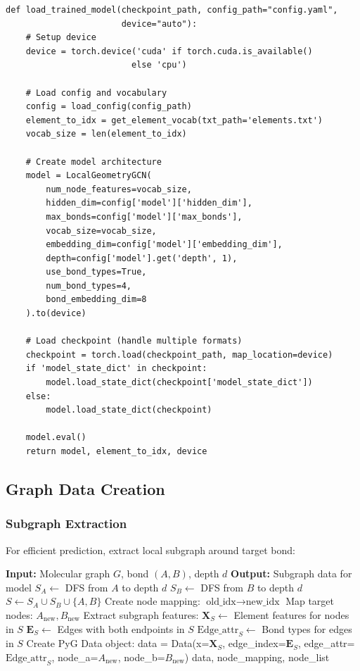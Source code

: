 \documentclass[11pt,a4paper]{article}
\begin{document}
\begin{lstlisting}[caption={Load Trained Model (lines 38-100)}]
def load_trained_model(checkpoint_path, config_path="config.yaml",
                       device="auto"):
    # Setup device
    device = torch.device('cuda' if torch.cuda.is_available()
                         else 'cpu')

    # Load config and vocabulary
    config = load_config(config_path)
    element_to_idx = get_element_vocab(txt_path='elements.txt')
    vocab_size = len(element_to_idx)

    # Create model architecture
    model = LocalGeometryGCN(
        num_node_features=vocab_size,
        hidden_dim=config['model']['hidden_dim'],
        max_bonds=config['model']['max_bonds'],
        vocab_size=vocab_size,
        embedding_dim=config['model']['embedding_dim'],
        depth=config['model'].get('depth', 1),
        use_bond_types=True,
        num_bond_types=4,
        bond_embedding_dim=8
    ).to(device)

    # Load checkpoint (handle multiple formats)
    checkpoint = torch.load(checkpoint_path, map_location=device)
    if 'model_state_dict' in checkpoint:
        model.load_state_dict(checkpoint['model_state_dict'])
    else:
        model.load_state_dict(checkpoint)

    model.eval()
    return model, element_to_idx, device
\end{lstlisting}

\subsection{Graph Data Creation}

\subsubsection{Subgraph Extraction}

For efficient prediction, extract local subgraph around target bond:

\begin{algorithm}
\caption{Extract Bond Subgraph}
\begin{algorithmic}[1]
\State \textbf{Input:} Molecular graph $G$, bond $(A, B)$, depth $d$
\State \textbf{Output:} Subgraph data for model
\State
\State $S_A \gets$ DFS from $A$ to depth $d$
\State $S_B \gets$ DFS from $B$ to depth $d$
\State $S \gets S_A \cup S_B \cup \{A, B\}$
\State
\State Create node mapping: $\text{old\_idx} \rightarrow \text{new\_idx}$
\State Map target nodes: $A_{\text{new}}, B_{\text{new}}$
\State
\State Extract subgraph features:
\State \quad $\mathbf{X}_S \gets$ Element features for nodes in $S$
\State \quad $\mathbf{E}_S \gets$ Edges with both endpoints in $S$
\State \quad $\text{Edge\_attr}_S \gets$ Bond types for edges in $S$
\State
\State Create PyG Data object:
\State \quad data = Data(x=$\mathbf{X}_S$, edge\_index=$\mathbf{E}_S$,
\State \quad \quad \quad \quad \quad edge\_attr=$\text{Edge\_attr}_S$,
\State \quad \quad \quad \quad \quad node\_a=$A_{\text{new}}$, node\_b=$B_{\text{new}}$)
\State \Return data, node\_mapping, node\_list
\end{algorithmic}
\end{algorithm}
\end{document}
